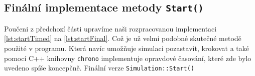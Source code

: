 \subsection{Finální implementace metody \texttt{Start()}}
Poučeni z předchozí části upravíme naši rozpracovanou implementaci \ref{lst:startTimed} na \ref{lst:startFinal}. Což je už velmi podobné skutečné metodě použité v programu. Která navíc umožňuje simulaci pozastavit, krokovat a také pomocí C++ knihovny \texttt{chrono} implementuje opravdové časování, které zde bylo uvedeno spíše koncepčně.
{Finální verze \texttt{Simulation::Start()}}

